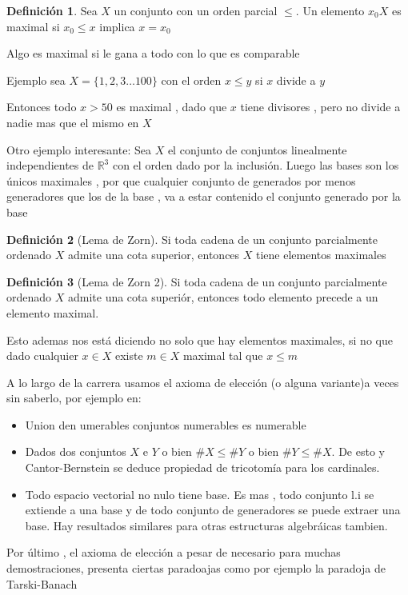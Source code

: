 \documentclass[12pt]{article}
\newcommand{\R}{\mathbb{R}}
\theoremstyle{definition}
\newtheorem{definition}{Definición}[section]
\begin{document}
\begin{definition}
  Sea $X$ un conjunto con un orden parcial $\leq$. Un elemento $x_{0} X$ es maximal si $x_{0} \leq x$ implica $x = x_{0}$
  
  Algo es maximal si le gana a todo con lo que es comparable

  Ejemplo sea $X = \{1,2,3 \dots 100\}$ con el orden $x \leq y$ si $x$ divide a $y$

  Entonces todo $x > 50$ es maximal , dado que $x$ tiene divisores , pero no divide a nadie mas que el mismo en $X$

  Otro ejemplo interesante: Sea $X$ el conjunto de conjuntos linealmente independientes de $\R^3$ con el orden dado por la inclusión. Luego las bases son los únicos maximales , por que cualquier conjunto de generados por menos generadores que los de la base , va a estar contenido el conjunto generado por la base
\end{definition}

\begin{definition}[Lema de Zorn]
  Si toda cadena de un conjunto parcialmente ordenado $X$ admite una cota superior, entonces $X$ tiene elementos maximales 
\end{definition}

\begin{definition}[Lema de Zorn 2]
  Si toda cadena de un conjunto parcialmente ordenado $X$ admite una cota superiór, entonces todo elemento precede a un elemento maximal.

Esto ademas nos está diciendo no solo que hay elementos maximales, si no que dado cualquier $x \in X$ existe $m \in X$ maximal tal que $x \leq m$
\end{definition}

A lo largo de la carrera usamos el axioma de elección (o alguna variante)a veces sin saberlo, por ejemplo en:
\begin{itemize}
  \item Union den umerables conjuntos numerables es numerable
  \item Dados dos conjuntos $X$ e $Y$ o bien $\# X \leq \# Y$ o bien $\# Y \leq \# X$. De esto y Cantor-Bernstein se deduce propiedad de tricotomía para los cardinales.
  \item Todo espacio vectorial no nulo tiene base. Es mas , todo conjunto l.i se extiende a una base y de todo conjunto de generadores se puede extraer una base. Hay resultados similares para otras estructuras algebráicas tambien.
  \end{itemize}

  Por último , el axioma de elección a pesar de necesario para muchas demostraciones, presenta ciertas paradoajas como por ejemplo la paradoja de Tarski-Banach
\end{document}
